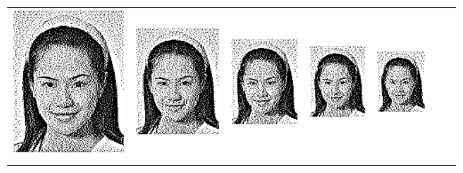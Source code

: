 \begin{tabular}{lllllll}
	\includegraphics{Ediphoto-1-3.png} &
	\includegraphics{Ediphoto-1-4.png} &
	\includegraphics{Ediphoto-1-5.png} &
	\includegraphics{Ediphoto-1-6.png} &
	\includegraphics{Ediphoto-1-7.png} \\
	 &
	 &
	 &
	 &
	 &
	 &
	 \\
\end{tabular}

